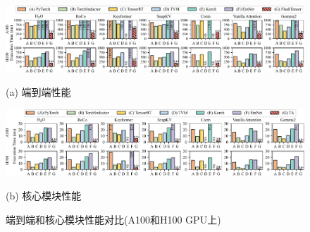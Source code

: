 
\begin{figure}[ht]
    \centering
    \begin{minipage}[t]{\textwidth}
        \includegraphics[width=\linewidth]{figures/flashtensor/e2e-crop.pdf}
    \end{minipage}
    \vspace{-0.5em}
    \caption*{\small (a) 端到端性能}
    
    \begin{minipage}[t]{\textwidth}
        \includegraphics[width=\linewidth]{figures/flashtensor/kernel-crop.pdf}
    \end{minipage}
    \vspace{-0.5em}
    \caption*{\small (b) 核心模块性能}
    \caption{端到端和核心模块性能对比(A100和H100 GPU上)}
    \label{fig:e2e-kernel}
\end{figure}

